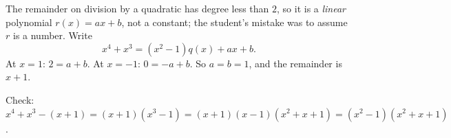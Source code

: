 The remainder on division by a quadratic has degree less than $2$, so it is a \emph{linear} polynomial $r(x)=ax+b$, not a constant; the student's mistake was to assume $r$ is a number. Write
\[
x^4+x^3=(x^2-1)q(x)+ax+b .
\]
At $x=1$: $2=a+b$. At $x=-1$: $0=-a+b$. So $a=b=1$, and the remainder is $\boxed{x+1}$.

Check: $x^4+x^3-(x+1)=(x+1)(x^3-1)=(x+1)(x-1)(x^2+x+1)=(x^2-1)(x^2+x+1)$.
